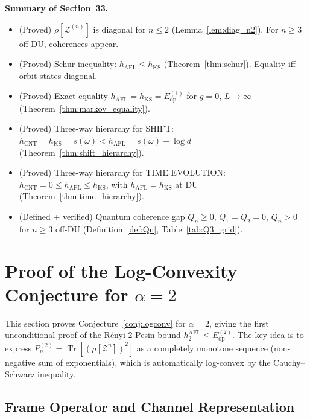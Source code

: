 \documentclass[12pt,a4paper]{article}
\begin{document}
\bigskip
\noindent\textbf{Summary of Section~33.}
\begin{itemize}
\item (Proved) $\rho[\mathcal{Z}^{(n)}]$ is diagonal for $n\leq 2$ (Lemma~\ref{lem:diag_n2}).
  For $n\geq 3$ off-DU, coherences appear.
\item (Proved) Schur inequality: $h_{\mathrm{AFL}}\leq h_{\mathrm{KS}}$
  (Theorem~\ref{thm:schur}).  Equality iff orbit states diagonal.
\item (Proved) Exact equality $h_{\mathrm{AFL}}=h_{\mathrm{KS}}=E_{\mathrm{op}}^{(1)}$ for
  $g=0$, $L\to\infty$ (Theorem~\ref{thm:markov_equality}).
\item (Proved) Three-way hierarchy for SHIFT: $h_{\mathrm{CNT}}=h_{\mathrm{KS}}=s(\omega)
  <h_{\mathrm{AFL}}=s(\omega)+\log d$ (Theorem~\ref{thm:shift_hierarchy}).
\item (Proved) Three-way hierarchy for TIME EVOLUTION:
  $h_{\mathrm{CNT}}=0\leq h_{\mathrm{AFL}}\leq h_{\mathrm{KS}}$, with
  $h_{\mathrm{AFL}}=h_{\mathrm{KS}}$ at DU (Theorem~\ref{thm:time_hierarchy}).
\item (Defined + verified) Quantum coherence gap $Q_n\geq 0$, $Q_1=Q_2=0$,
  $Q_n>0$ for $n\geq 3$ off-DU (Definition~\ref{def:Qn}, Table~\ref{tab:Q3_grid}).
\end{itemize}

\section{Proof of the Log-Convexity Conjecture for $\alpha=2$}
\label{sec:logconv_proof}

This section proves Conjecture~\ref{conj:logconv} for $\alpha=2$, giving the
first unconditional proof of the Rényi-2 Pesin bound
$h_2^{\mathrm{AFL}}\leq E_{\mathrm{op}}^{(2)}$.
The key idea is to express $P_n^{(2)}=\operatorname{Tr}[(\rho[\mathcal{Z}^n])^2]$
as a completely monotone sequence (non-negative sum of exponentials), which is
automatically log-convex by the Cauchy--Schwarz inequality.

\subsection{Frame Operator and Channel Representation}
\label{sec:frame_channel}
\end{document}
